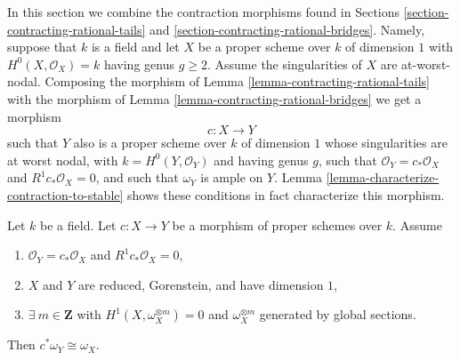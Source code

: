 \noindent
In this section we combine the contraction morphisms found in
Sections \ref{section-contracting-rational-tails} and
\ref{section-contracting-rational-bridges}.
Namely, suppose that $k$ is a field and let $X$ be a proper scheme over $k$
of dimension $1$ with $H^0(X, \mathcal{O}_X) = k$ having genus $g \geq 2$.
Assume the singularities of $X$ are at-worst-nodal. Composing
the morphism of Lemma \ref{lemma-contracting-rational-tails}
with the morphism of Lemma \ref{lemma-contracting-rational-bridges}
we get a morphism
$$
c : X \longrightarrow Y
$$
such that $Y$ also is a proper scheme over $k$ of dimension $1$
whose singularities are at worst nodal, with $k = H^0(Y, \mathcal{O}_Y)$
and having genus $g$, such that
$\mathcal{O}_Y = c_*\mathcal{O}_X$ and $R^1c_*\mathcal{O}_X = 0$,
and such that $\omega_Y$ is ample on $Y$.
Lemma \ref{lemma-characterize-contraction-to-stable}
shows these conditions in fact characterize
this morphism.

\begin{lemma}
\label{lemma-contract-gorenstein-canonical}
Let $k$ be a field. Let $c : X \to Y$ be a morphism of proper schemes over $k$.
Assume
\begin{enumerate}
\item $\mathcal{O}_Y = c_*\mathcal{O}_X$ and $R^1c_*\mathcal{O}_X = 0$,
\item $X$ and $Y$ are reduced, Gorenstein, and have dimension $1$,
\item $\exists\ m \in \mathbf{Z}$ with
$H^1(X, \omega_X^{\otimes m}) = 0$ and $\omega_X^{\otimes m}$
generated by global sections.
\end{enumerate}
Then $c^*\omega_Y \cong \omega_X$.
\end{lemma}

